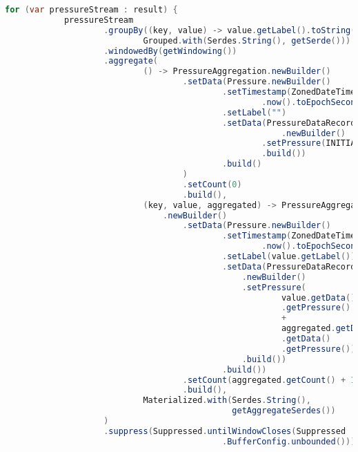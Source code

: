 \begin{lstlisting}[caption=Poprzednia implementacja przetwarzająca strumienie danych, label={lst:pressure_mean_stream_factory},language=Java]
        for (var pressureStream : result) {
            pressureStream
                    .groupBy((key, value) -> value.getLabel().toString(),
                            Grouped.with(Serdes.String(), getSerde()))
                    .windowedBy(getWindowing())
                    .aggregate(
                            () -> PressureAggregation.newBuilder()
                                    .setData(Pressure.newBuilder()
                                            .setTimestamp(ZonedDateTime
                                                    .now().toEpochSecond())
                                            .setLabel("")
                                            .setData(PressureDataRecord
                                                        .newBuilder()
                                                    .setPressure(INITIAL_VALUE)
                                                    .build())
                                            .build()
                                    )
                                    .setCount(0)
                                    .build(),
                            (key, value, aggregated) -> PressureAggregation
                                .newBuilder()
                                    .setData(Pressure.newBuilder()
                                            .setTimestamp(ZonedDateTime
                                                    .now().toEpochSecond())
                                            .setLabel(value.getLabel())
                                            .setData(PressureDataRecord
                                                .newBuilder()
                                                .setPressure(
                                                        value.getData()
                                                        .getPressure() 
                                                        + 
                                                        aggregated.getData()
                                                        .getData()
                                                        .getPressure())
                                                .build())
                                            .build())
                                    .setCount(aggregated.getCount() + 1)
                                    .build(),
                            Materialized.with(Serdes.String(), 
                                              getAggregateSerdes())
                    )
                    .suppress(Suppressed.untilWindowCloses(Suppressed
                                            .BufferConfig.unbounded()))

\end{lstlisting}
